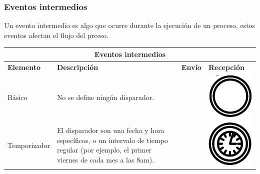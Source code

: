 \subsubsection{Eventos intermedios}
Un evento intermedio es algo que ocurre durante la ejecución de un proceso, estos eventos afectan el flujo del prceso.

\begin{table}[H]
	\centering
	\begin{tabular}{ |p{2cm}|p{9.5cm}|p{1.7cm}|p{1.7cm}|  }
		\hline
		\multicolumn{4}{|c|}{Eventos intermedios} \\
		\hline
		\textbf{Elemento}& \textbf{Descripción}&\textbf{Envío} & \textbf{Recepción}\\
		
		\hline
		{\small Básico } & {\small No se define ningún disparador.  } & &\vspace{0.5mm} \hspace{2mm} \includegraphics[scale=0.2]{Capitulo2/imagenes/BasicoR} \\
		
		\hline
		{\small Temporizador } & {\small El disparador son una fecha y hora específicos, o un intervalo de tiempo regular (por ejemplo, el primer viernes de cada mes a las 8am). } & &\vspace{0.5mm} \hspace{2mm} \includegraphics[scale=0.2]{Capitulo2/imagenes/TemporizadorR} \\


\end{tabular}
\end{table}
